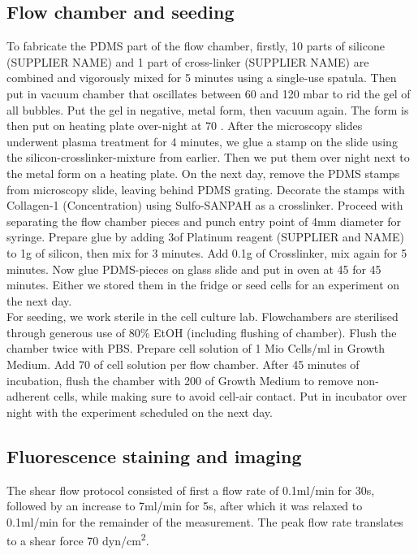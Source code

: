 \subsection{Flow chamber and seeding}
\label{sec:FluidicModel}
To fabricate the PDMS part of the flow chamber, firstly, 10 parts of silicone (SUPPLIER NAME) and 1 part of cross-linker (SUPPLIER NAME) are combined and vigorously mixed for 5 minutes using a single-use spatula. Then put in vacuum chamber that oscillates between 60 and 120 mbar to rid the gel of all bubbles. Put the gel in negative, metal form, then vacuum again. The form is then put on heating plate over-night at 70 \degC{}. After the microscopy slides underwent plasma treatment for 4 minutes, we glue a stamp on the slide using the silicon-crosslinker-mixture from earlier. Then we put them over night next to the metal form on a heating plate. On the next day, remove the PDMS stamps from microscopy slide, leaving behind PDMS grating. Decorate the stamps with Collagen-1 (Concentration) using Sulfo-SANPAH as a crosslinker. Proceed with separating the flow chamber pieces and punch entry point of 4mm diameter for syringe. Prepare glue by adding 3\mul of Platinum reagent (SUPPLIER and NAME) to 1g of silicon, then mix for 3 minutes. Add 0.1g of Crosslinker, mix again for 5 minutes. Now glue PDMS-pieces on glass slide and put in oven at 45 \degC{} for 45 minutes. Either we stored them in the fridge or seed cells for an experiment on the next day.\\
For seeding, we work sterile in the cell culture lab. Flowchambers are sterilised through generous use of 80\% EtOH (including flushing of chamber). Flush the chamber twice with PBS. Prepare cell solution of 1 Mio Cells/ml in Growth Medium. Add 70 \mul{} of cell solution per flow chamber. After 45 minutes of incubation, flush the chamber with 200\mul{} of Growth Medium to remove non-adherent cells, while making sure to avoid cell-air contact. Put in incubator over night with the experiment scheduled on the next day.

\subsection{Fluorescence staining and imaging}
\label{sec:LiveImaging}

The shear flow protocol consisted of first a flow rate of 0.1ml/min for 30s, followed by an increase to 7ml/min for 5s, after which it was relaxed to 0.1ml/min for the remainder of the measurement. The peak flow rate translates to a shear force 70 dyn/cm\textsuperscript{2}. 


